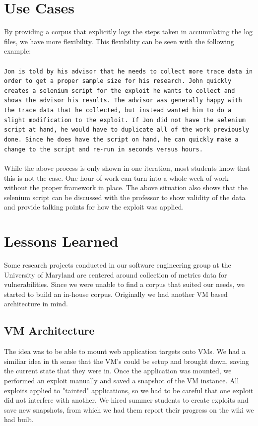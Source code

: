 \documentclass[letterpaper,twocolumn,10pt]{article}
\begin{document}
\section{Use Cases}
By providing a corpus that explicitly logs the steps taken in accumulating the log files, we have more flexibility.  This flexibility can be seen with the following example:  
\\\\
{\tt Jon is told by his advisor that he needs to collect more trace data in order to get a proper sample size for his research.  John quickly creates a selenium script for the exploit he wants to collect and shows the advisor his results.  The advisor was generally happy with the trace data that he collected, but instead wanted him to do a slight modification to the exploit.  If Jon did not have the selenium script at hand, he would have to duplicate all of the work previously done.  Since he does have the script on hand, he can quickly make a change to the script and re-run in seconds versus hours.}
\\\\
While the above process is only shown in one iteration, most students know that this is not the case.  One hour of work can turn into a whole week of work without the proper framework in place.  The above situation also shows that the selenium script can be discussed with the professor to show validity of the data and provide talking points for how the exploit was applied.

\section{Lessons Learned}

Some research projects conducted in our software engineering group at the University of Maryland are centered around collection of metrics data for vulnerabilities.  Since we were unable to find a corpus that suited our needs, we started to build an in-house corpus.  Originally we had another VM based architecture in mind.  

\subsection{VM Architecture}
The idea was to be able to mount web application targets onto VMs.  We had a similiar idea in th sense that the VM's could be setup and brought down, saving the current state that they were in.  Once the application was mounted, we performed an exploit manually and saved a snapshot of the VM instance.  All exploits applied to "tainted" applications, so we had to be careful that one exploit did not interfere with another.  We hired summer students to create exploits and save new snapshots, from which we had them report their progress on the wiki we had built.  
\end{document}
